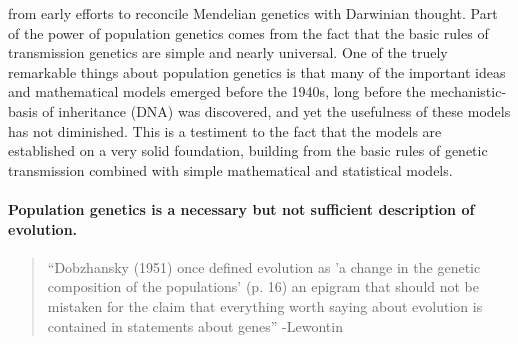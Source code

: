  from early efforts to
reconcile Mendelian genetics with Darwinian thought.
Part of the power of
population genetics comes from the fact that the basic rules of
transmission genetics are simple and nearly universal.  One of the truely remarkable things about population genetics is that
many of the important ideas and mathematical models emerged before the
1940s, long before the
mechanistic-basis of inheritance (DNA) was discovered, and yet the
usefulness of these models has not diminished. This is a testiment to
the fact that the models are established on a very solid foundation,
building from the basic rules of genetic transmission combined with
simple mathematical and statistical models.   

\paragraph{Population genetics is a necessary but not sufficient description of evolution.}
\begin{quote}
``Dobzhansky (1951) once defined evolution as 'a change in the genetic
composition of the populations' (p. 16) an epigram that should not be
mistaken for the claim that everything worth saying about evolution is
contained in statements about genes'' -Lewontin \cite{lewontin01} 
\end{quote}




\newpage